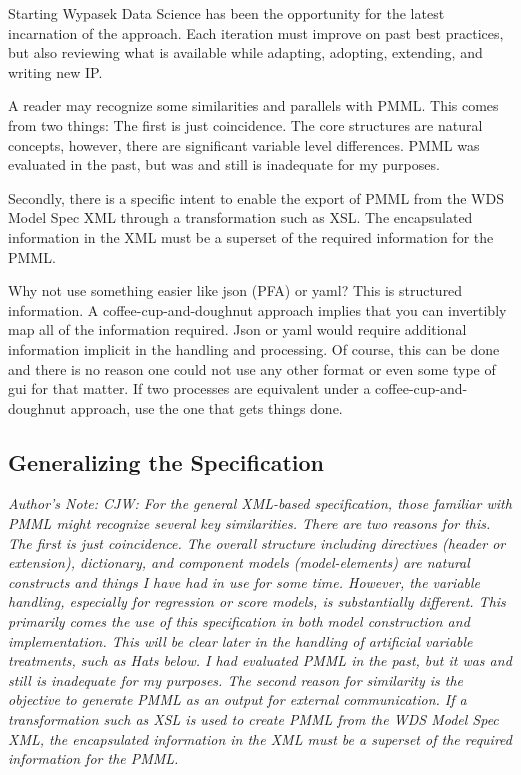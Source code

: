 \documentclass[10pt]{article}
\begin{document}
Starting Wypasek Data Science has been the opportunity for the latest incarnation of the approach. Each iteration must improve on past best practices, but also reviewing what is available while adapting, adopting, extending, and writing new IP.

A reader may recognize some similarities and parallels with PMML.  This comes from two things:  The first is just coincidence. The core structures are natural concepts, however, there are significant variable level differences.   PMML was evaluated in the past, but was and still is inadequate for my purposes. 

Secondly, there is a specific intent to enable the export of PMML from the WDS Model Spec XML through a transformation such as XSL.  The encapsulated information in the XML must be a superset of the required information for the PMML.

Why not use something easier like json (PFA) or yaml?  This is structured information.  A coffee-cup-and-doughnut approach implies that you can invertibly map all of the information required.  Json or yaml would require additional information implicit in the handling and processing.  Of course, this can be done and there is no reason one could not use any other format or even some type of gui for that matter.  If two processes are equivalent under a coffee-cup-and-doughnut approach, use the one that gets things done.

\fi


\subsection{Generalizing the Specification\label{generalizing_the_specification}}

{\em Author's Note: CJW: For the general XML-based specification, those familiar with PMML might recognize several key similarities.  There are
two reasons for this.  The first is just coincidence.  The overall structure including directives (header or extension), dictionary, and
component models (model-elements) are natural constructs and things I have had in use for some time. However, the variable handling, especially
for regression or score models, is substantially different.  This primarily comes the use of this specification in both model construction and
implementation.  This will be clear later in the handling of artificial variable treatments, such as {\em Hats} below.  
I had evaluated PMML in the past, but it was and still is inadequate for my purposes.  The second reason for similarity is the objective to generate PMML as an
output for external communication.  If a transformation such as XSL is used to create PMML from the WDS Model Spec XML, the encapsulated
information in the XML must be a superset of the required information for the PMML.
}
\end{document}
